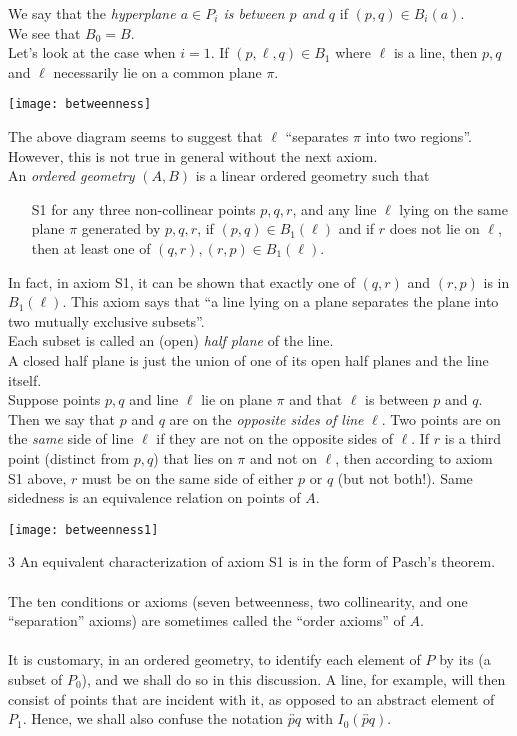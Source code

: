 \documentclass[12pt]{article}
\renewcommand{\line}[1]{\overleftrightarrow{#1}}
\begin{document}
We say that the \emph{hyperplane $a \in P_i$ is
between $p$ and $q$} if $(p,q)\in B_i(a)$. \\
We see that $B_0=B$. \\
Let's look at the case when $i=1$. If $(p,\ell,q)\in B_1$ where
$\ell$ is a line, then $p,q$ and $\ell$ necessarily lie on a common
plane $\pi$.
\begin{center}
\texttt{[image: betweenness]}
\end{center}
The above diagram seems to suggest that $\ell$ ``separates $\pi$ into two regions''.  However, this is not true in general without the next axiom.  \\
An \emph{ordered geometry} $(A,B)$ is a linear ordered geometry such that
\begin{itemize}
\item[S1] for any three non-collinear points $p,q,r$, and any line $\ell$
lying on the same plane $\pi$ generated by $p,q,r$, if $(p,q)\in
B_1(\ell)$ and if $r$ does not lie on $\ell$, then at least one of
$(q,r),(r,p)\in B_1(\ell)$.
\end{itemize}
In fact, in axiom S1, it can be shown that exactly one of $(q,r)$ and $(r,p)$ is in $B_1(\ell)$.  This axiom says that ``a line lying on a plane separates the plane into two mutually exclusive subsets''. \\
 Each subset is called an (open) \emph{half plane} of the line.  \\
A closed half plane is just the union of one of its open half planes and the line itself. \\
 Suppose points $p,q$ and line $\ell$ lie on plane $\pi$ and that $\ell$ is between $p$ and $q$.  Then we say that $p$ and $q$ are on the \emph{opposite sides of line} $\ell$.  Two points are on the \emph{same} side of line $\ell$ if they are not on the opposite sides of $\ell$.  If $r$ is a third point (distinct from $p,q$) that lies on $\pi$ and not on $\ell$, then according to axiom S1 above, $r$ must be on the same side of either $p$ or $q$ (but not both!).  Same sidedness is an equivalence relation on points of $A$.
\begin{center}
\texttt{[image: betweenness1]}
\end{center}3
An equivalent characterization of axiom S1 is in the form of Pasch's theorem.
\\\\
The ten conditions or axioms (seven betweenness, two collinearity,
and one ``separation'' axioms) are sometimes called the ``order axioms''
of $A$.
\\\\
It is customary, in an ordered geometry, to identify each element of
$P$ by its  (a subset of $P_0$), and we shall do so in this discussion. A line, for example, will then consist of points that are incident with it, as opposed to an abstract element of $P_1$.
Hence, we shall also confuse the notation $\line{pq}$ with $I_0(\line{pq})$.
\\\\
\end{document}
